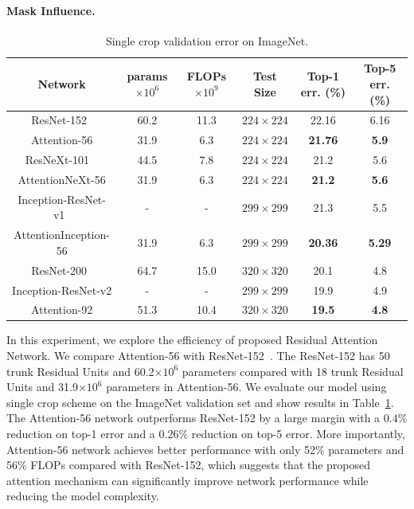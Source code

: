 \documentclass[10pt,twocolumn,letterpaper]{article}
\begin{document}
\paragraph{Mask Influence.}

\begin{table}\small
\setlength{\abovecaptionskip}{0pt}
\setlength{\belowcaptionskip}{-10pt}
\begin{center}
\begin{tabular}{c|c|c|c|c|c} \hline
Network & params$\times 10^6$ &FLOPs$\times 10^9$ & Test Size &Top-1 err. (\%) &Top-5 err. (\%) \\
\hline
ResNet-152~\cite{resnet2016}  &60.2 &11.3 &$224\times224$&22.16 &6.16\\
\hline
Attention-56 &31.9 &6.3 &$224\times224$&\textbf{21.76} &\textbf{5.9} \\
\hline
\hline
ResNeXt-101 ~\cite{resnext}&44.5 & 7.8&$224\times224$    &21.2 &5.6 \\
\hline
AttentionNeXt-56 &31.9 & 6.3&$224\times224$  &\textbf{21.2} &\textbf{5.6} \\
\hline
\hline
Inception-ResNet-v1~\cite{inception} &- &-&$299\times299$&21.3 &5.5 \\
\hline
AttentionInception-56 &31.9 & 6.3 &$299\times299$ &\textbf{20.36} &\textbf{5.29} \\
\hline
\hline
ResNet-200~\cite{he2016identity} &64.7 &15.0 &$320\times320$ &20.1  &4.8 \\
\hline
{Inception-ResNet-v2} &- &- &$299\times299$ &19.9  &4.9 \\
\hline
Attention-92 &51.3  & 10.4&$320\times320$ &\textbf{19.5 }  &\textbf{4.8} \\
\hline
\end{tabular}
\end{center}
	\caption{Single crop validation error on ImageNet.
}
\label{tab:single_crop_validation_error}
\end{table}

In this experiment, we explore the efficiency of proposed Residual Attention Network.
%
We compare Attention-56 with ResNet-152~\cite{resnet2016}.
%
The ResNet-152 has 50 trunk Residual Units and 60.2$\times 10^6$ parameters compared with 18 trunk Residual Units and 31.9$\times 10^6$ parameters in Attention-56.
%
We evaluate our model using single crop scheme on the ImageNet validation set and show results in Table~\ref{tab:single_crop_validation_error}.
%
The Attention-56 network outperforms ResNet-152 by a large margin with a $0.4\%$ reduction on top-1 error and a $0.26\%$ reduction on top-5 error.
%
More importantly, Attention-56 network achieves better performance with only 52\% parameters and 56\% FLOPs compared with ResNet-152, which suggests that the proposed attention mechanism can significantly improve network performance while reducing the model complexity.
\end{document}
